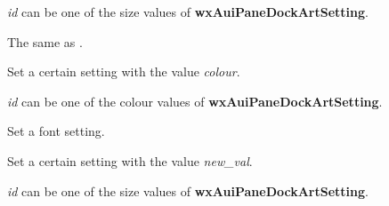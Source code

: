 {\it id} can be one of the size values of {\bf wxAuiPaneDockArtSetting}.


\label{wxauidockartsetcolor}


The same as .

\label{wxauidockartsetcolour}


Set a certain setting with the value {\it colour}.

{\it id} can be one of the colour values of {\bf wxAuiPaneDockArtSetting}.

\label{wxauidockartsetfont}


Set a font setting.

\label{wxauidockartsetmetric}


Set a certain setting with the value {\it new\_val}.

{\it id} can be one of the size values of {\bf wxAuiPaneDockArtSetting}.

